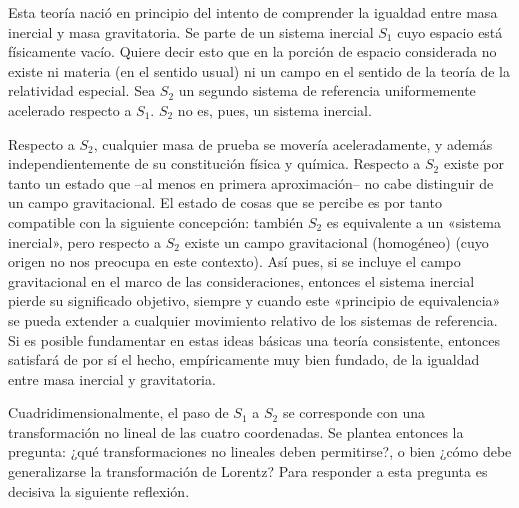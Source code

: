 \documentclass[spanish]{book}
\begin{document}
Esta teoría nació en principio del intento de comprender la igualdad entre masa inercial 
y masa gravitatoria. Se parte de
un sistema inercial $S_{1}$ cuyo espacio está físicamente vacío. Quiere decir esto que en la
porción de espacio considerada no existe ni materia (en el sentido usual) ni un campo en
el sentido de la teoría de la relatividad especial. Sea $S_{2}$ un segundo sistema de referencia
uniformemente acelerado respecto a $S_{1}$. $S_{2}$ no es, pues, un sistema inercial. 

Respecto a $S_{2}$, cualquier masa de prueba se movería aceleradamente, y además
independientemente de su constitución física y química. Respecto a $S_{2}$ existe por tanto
un estado que --al menos en primera aproximación-- no cabe distinguir de un campo
gravitacional. El estado de cosas que se percibe es por tanto compatible con la
siguiente concepción: también $S_{2}$ es equivalente a un «sistema inercial», pero respecto a
$S_{2}$ existe un campo gravitacional (homogéneo) (cuyo origen no nos preocupa en este
contexto). Así pues, si se incluye el campo gravitacional en el marco de las
consideraciones, entonces el sistema inercial pierde su significado objetivo, siempre y
cuando este «principio de equivalencia» se pueda extender a cualquier movimiento
relativo de los sistemas de referencia. Si es posible fundamentar en estas ideas básicas
una teoría consistente, entonces satisfará de por sí el hecho, empíricamente muy bien
fundado, de la igualdad entre masa inercial y gravitatoria.

Cuadridimensionalmente, el paso de $S_{1}$ a $S_{2}$ se corresponde con una transformación
no lineal de las cuatro coordenadas. Se plantea entonces la pregunta: ¿qué
transformaciones no lineales deben permitirse?, o bien ¿cómo debe generalizarse la
transformación de Lorentz? Para responder a esta pregunta es decisiva la siguiente
reflexión.
\end{document}
